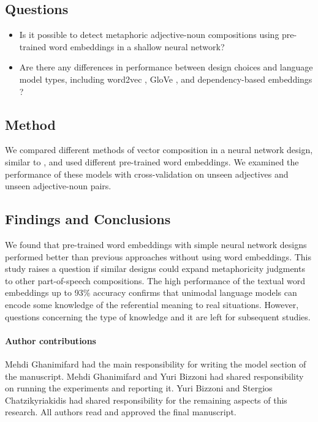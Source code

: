 \subsection{Questions}

\begin{itemize}
	\item Is it possible to detect metaphoric adjective-noun compositions using pre-trained word embeddings in a shallow neural network? 
	\item Are there any differences in performance between design choices and language model types, including word2vec \citep{mikolov2013distributed}, GloVe \citep{pennington-etal-2014-glove}, and dependency-based embeddings \citep{levy-goldberg-2014-dependency}?
\end{itemize}

\subsection{Method}
We compared different methods of vector composition in a neural network design, similar to \cite{mitchell2010composition}, and used different pre-trained word embeddings. 
We examined the performance of these models with cross-validation on unseen adjectives and unseen adjective-noun pairs.

\subsection{Findings and Conclusions}
We found that pre-trained word embeddings with simple neural network designs performed better than previous approaches without using word embeddings. 
This study raises a question if similar designs could expand metaphoricity judgments to other part-of-speech compositions. 
The high performance of the textual word embeddings up to 93\% accuracy confirms that unimodal language models can encode some knowledge of the referential meaning to real situations. 
However, questions concerning the type of knowledge and it are left for subsequent studies.

\paragraph{Author contributions}
Mehdi Ghanimifard had the main responsibility for writing the model section of the manuscript. Mehdi Ghanimifard and Yuri Bizzoni had shared responsibility on running the experiments and reporting it. Yuri Bizzoni and Stergios Chatzikyriakidis had shared responsibility for the remaining aspects of this research. All authors read and approved the final manuscript.

